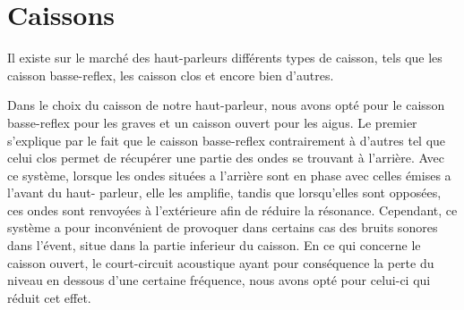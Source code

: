 \section{Caissons}

Il existe sur le marché des haut-parleurs
différents types de caisson, tels que
les caisson basse-reflex, les caisson clos et encore bien d’autres.

Dans le choix du caisson de notre haut-parleur,
nous avons opté pour le caisson basse-reflex pour les graves
et un caisson ouvert pour les aigus.
Le premier s’explique par le fait que le caisson basse-reflex
contrairement à d’autres tel que celui clos permet de récupérer
une partie des ondes se trouvant à l’arrière.
Avec ce système, lorsque les ondes situées a l’arrière sont en phase
avec celles émises a l’avant du haut- parleur, elle les amplifie,
tandis que lorsqu’elles  sont opposées,
ces ondes sont renvoyées à l’extérieure afin de réduire la résonance.
Cependant, ce système a pour inconvénient de provoquer dans certains cas
des bruits sonores dans l’évent, situe dans la partie inferieur du caisson.
En ce qui concerne le caisson ouvert,
le court-circuit acoustique ayant pour conséquence la perte du niveau
en dessous d’une certaine fréquence,
nous avons opté pour celui-ci qui réduit cet effet.
